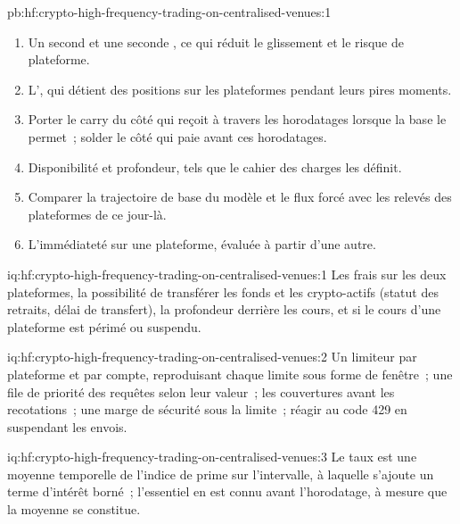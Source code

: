 \begin{solution}{pb:hf:crypto-high-frequency-trading-on-centralised-venues:1}
\begin{enumerate}
\item Un second  et une seconde , ce qui réduit le glissement et le risque de plateforme.
\item L', qui détient des positions sur les plateformes pendant leurs pires moments.
\item Porter le carry du côté qui reçoit à travers les horodatages lorsque la base le permet~; solder le côté qui paie avant ces horodatages.
\item Disponibilité et profondeur, tels que le cahier des charges les définit.
\item Comparer la trajectoire de base du modèle et le flux forcé avec les relevés des plateformes de ce jour-là.
\item L'immédiateté sur une plateforme, évaluée à partir d'une autre.
\end{enumerate}
\end{solution}

\begin{solution}{iq:hf:crypto-high-frequency-trading-on-centralised-venues:1}
Les frais sur les deux plateformes, la possibilité de transférer les fonds et les crypto-actifs (statut des retraits, délai de transfert), la profondeur derrière les cours, et si le cours d'une
plateforme est périmé ou suspendu.
\end{solution}

\begin{solution}{iq:hf:crypto-high-frequency-trading-on-centralised-venues:2}
Un limiteur par plateforme et par compte, reproduisant chaque limite sous forme de fenêtre~; une file de priorité des requêtes selon leur valeur~; les couvertures avant les recotations~; une
marge de sécurité sous la limite~; réagir au code 429 en suspendant les envois.
\end{solution}

\begin{solution}{iq:hf:crypto-high-frequency-trading-on-centralised-venues:3}
Le taux est une moyenne temporelle de l'indice de prime sur l'intervalle, à laquelle s'ajoute un terme d'intérêt borné~; l'essentiel en est connu avant l'horodatage, à mesure que la
moyenne se constitue.
\end{solution}

